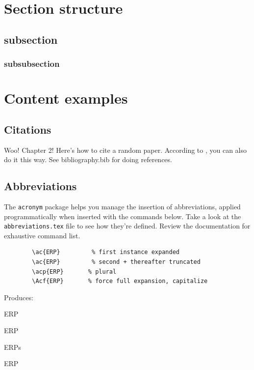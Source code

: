 \documentclass[../../main.tex]{subfiles}  %
\begin{document}
\section{Section structure}

	\subsection{subsection}

	\subsubsection{subsubsection}

\section{Content examples}

	\subsection{Citations}

	Woo! 
	Chapter 2!
	Here's how to cite a random paper\supercite{aartsSolutionDependencyUsing2014}. 
	According to \citeauthor{aartsSolutionDependencyUsing2014} \citeyear{aartsSolutionDependencyUsing2014}, you can also do it this way.
	See bibliography.bib for doing references.

	\subsection{Abbreviations}

	The \verb|acronym| package helps you manage the insertion of abbreviations, applied programmatically when inserted with the commands below. 
	Take a look at the \verb|abbreviations.tex| file to see how they're defined.
	Review the documentation for exhaustive command list.

	\begin{verbatim}
		\ac{ERP}		 % first instance expanded
		\ac{ERP}		 % second + thereafter truncated
		\acp{ERP}		% plural
		\Acf{ERP}		% force full expansion, capitalize
	  \end{verbatim}

	Produces: 
	\begin{enumerate*}[label=(\roman*), itemjoin={{, }}, itemjoin={{, }}, itemjoin*={{, and }}]
	\item \ac{ERP}
	\item \ac{ERP}
	\item \acp{ERP}
	\item \Acf{ERP}	
	\end{enumerate*}
\end{document}
